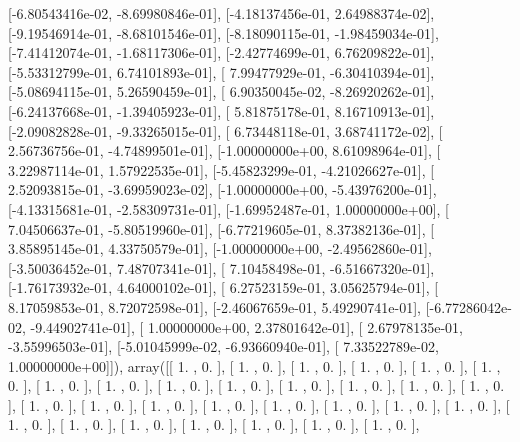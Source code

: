 \documentclass{article}
\begin{document}
       [-6.80543416e-02, -8.69980846e-01],
       [-4.18137456e-01,  2.64988374e-02],
       [-9.19546914e-01, -8.68101546e-01],
       [-8.18090115e-01, -1.98459034e-01],
       [-7.41412074e-01, -1.68117306e-01],
       [-2.42774699e-01,  6.76209822e-01],
       [-5.53312799e-01,  6.74101893e-01],
       [ 7.99477929e-01, -6.30410394e-01],
       [-5.08694115e-01,  5.26590459e-01],
       [ 6.90350045e-02, -8.26920262e-01],
       [-6.24137668e-01, -1.39405923e-01],
       [ 5.81875178e-01,  8.16710913e-01],
       [-2.09082828e-01, -9.33265015e-01],
       [ 6.73448118e-01,  3.68741172e-02],
       [ 2.56736756e-01, -4.74899501e-01],
       [-1.00000000e+00,  8.61098964e-01],
       [ 3.22987114e-01,  1.57922535e-01],
       [-5.45823299e-01, -4.21026627e-01],
       [ 2.52093815e-01, -3.69959023e-02],
       [-1.00000000e+00, -5.43976200e-01],
       [-4.13315681e-01, -2.58309731e-01],
       [-1.69952487e-01,  1.00000000e+00],
       [ 7.04506637e-01, -5.80519960e-01],
       [-6.77219605e-01,  8.37382136e-01],
       [ 3.85895145e-01,  4.33750579e-01],
       [-1.00000000e+00, -2.49562860e-01],
       [-3.50036452e-01,  7.48707341e-01],
       [ 7.10458498e-01, -6.51667320e-01],
       [-1.76173932e-01,  4.64000102e-01],
       [ 6.27523159e-01,  3.05625794e-01],
       [ 8.17059853e-01,  8.72072598e-01],
       [-2.46067659e-01,  5.49290741e-01],
       [-6.77286042e-02, -9.44902741e-01],
       [ 1.00000000e+00,  2.37801642e-01],
       [ 2.67978135e-01, -3.55996503e-01],
       [-5.01045999e-02, -6.93660940e-01],
       [ 7.33522789e-02,  1.00000000e+00]]), array([[ 1.        ,  0.        ],
       [ 1.        ,  0.        ],
       [ 1.        ,  0.        ],
       [ 1.        ,  0.        ],
       [ 1.        ,  0.        ],
       [ 1.        ,  0.        ],
       [ 1.        ,  0.        ],
       [ 1.        ,  0.        ],
       [ 1.        ,  0.        ],
       [ 1.        ,  0.        ],
       [ 1.        ,  0.        ],
       [ 1.        ,  0.        ],
       [ 1.        ,  0.        ],
       [ 1.        ,  0.        ],
       [ 1.        ,  0.        ],
       [ 1.        ,  0.        ],
       [ 1.        ,  0.        ],
       [ 1.        ,  0.        ],
       [ 1.        ,  0.        ],
       [ 1.        ,  0.        ],
       [ 1.        ,  0.        ],
       [ 1.        ,  0.        ],
       [ 1.        ,  0.        ],
       [ 1.        ,  0.        ],
       [ 1.        ,  0.        ],
       [ 1.        ,  0.        ],
       [ 1.        ,  0.        ],
       [ 1.        ,  0.        ],
       [ 1.        ,  0.        ],
\end{document}
